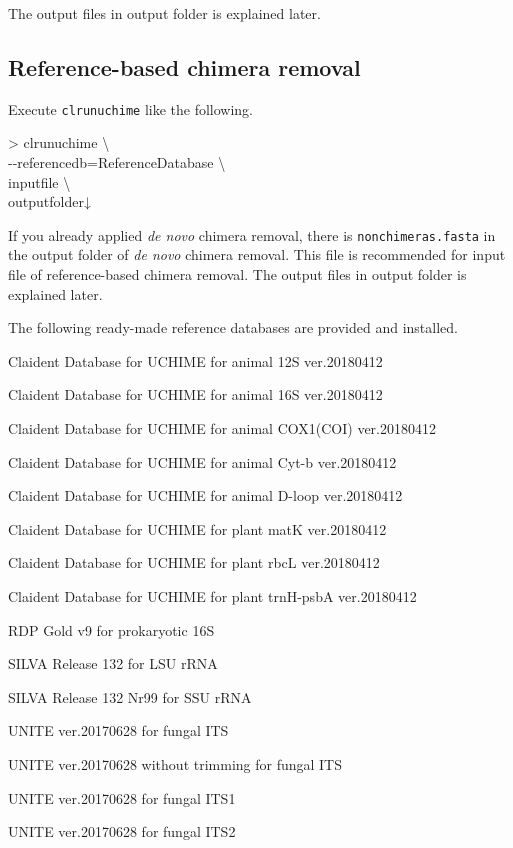 \documentclass[titlepage,10pt,a4paper,english]{jsbook}
\newenvironment{cmd}{\begin{oframed}\raggedright\ttfamily\footnotesize\setlength{\baselineskip}{1.4em}}{\end{oframed}\vspace{-1em}}
\begin{document}
The output files in output folder is explained later.

\subsection{Reference-based chimera removal}

Execute \texttt{clrunuchime} like the following.

\begin{cmd}
{\textgreater} clrunuchime {\textbackslash}\\
{-}{-}referencedb=ReferenceDatabase {\textbackslash}\\
inputfile {\textbackslash}\\
outputfolder↓
\end{cmd}

If you already applied \textit{de novo} chimera removal, there is \texttt{nonchimeras.fasta} in the output folder of \textit{de novo} chimera removal.
This file is recommended for input file of reference-based chimera removal.
The output files in output folder is explained later.

The following ready-made reference databases are provided and installed.

\begin{description}\small\setlength{\baselineskip}{1.1em}
\item[cdu12s] Claident Database for UCHIME for animal 12S ver.20180412
\item[cdu16s] Claident Database for UCHIME for animal 16S ver.20180412
\item[cducox1] Claident Database for UCHIME for animal COX1(COI) ver.20180412
\item[cducytb] Claident Database for UCHIME for animal Cyt-b ver.20180412
\item[cdudloop] Claident Database for UCHIME for animal D-loop ver.20180412
\item[cdumatk] Claident Database for UCHIME for plant matK ver.20180412
\item[cdurbcl] Claident Database for UCHIME for plant rbcL ver.20180412
\item[cdutrnhpsba] Claident Database for UCHIME for plant trnH-psbA ver.20180412
\item[rdpgoldv9] RDP Gold v9 for prokaryotic 16S
\item[silva132LSUref] SILVA Release 132 for LSU rRNA
\item[silva132SSUrefnr99] SILVA Release 132 Nr99 for SSU rRNA
\item[unite20170628] UNITE ver.20170628 for fungal ITS
\item[unite20170628untrim] UNITE ver.20170628 without trimming for fungal ITS
\item[unite20170628its1] UNITE ver.20170628 for fungal ITS1
\item[unite20170628its2] UNITE ver.20170628 for fungal ITS2
\end{description}
\end{document}
